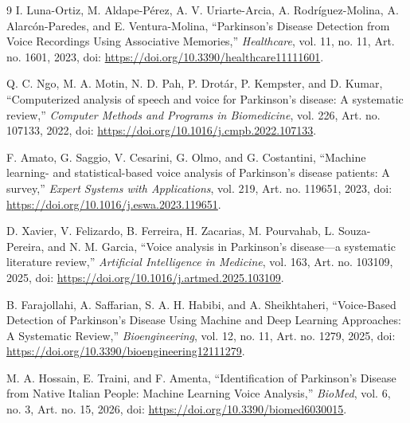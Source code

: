 \documentclass[11pt,a4paper]{article}
\begin{document}
\begin{thebibliography}{9}
I. Luna-Ortiz, M. Aldape-Pérez, A. V. Uriarte-Arcia, A. Rodríguez-Molina, A. Alarcón-Paredes, and E. Ventura-Molina, ``Parkinson's Disease Detection from Voice Recordings Using Associative Memories,'' \emph{Healthcare}, vol. 11, no. 11, Art. no. 1601, 2023, doi: \url{https://doi.org/10.3390/healthcare11111601}.

Q. C. Ngo, M. A. Motin, N. D. Pah, P. Drotár, P. Kempster, and D. Kumar, ``Computerized analysis of speech and voice for Parkinson's disease: A systematic review,'' \emph{Computer Methods and Programs in Biomedicine}, vol. 226, Art. no. 107133, 2022, doi: \url{https://doi.org/10.1016/j.cmpb.2022.107133}.

F. Amato, G. Saggio, V. Cesarini, G. Olmo, and G. Costantini, ``Machine learning- and statistical-based voice analysis of Parkinson's disease patients: A survey,'' \emph{Expert Systems with Applications}, vol. 219, Art. no. 119651, 2023, doi: \url{https://doi.org/10.1016/j.eswa.2023.119651}.

D. Xavier, V. Felizardo, B. Ferreira, H. Zacarias, M. Pourvahab, L. Souza-Pereira, and N. M. Garcia, ``Voice analysis in Parkinson's disease---a systematic literature review,'' \emph{Artificial Intelligence in Medicine}, vol. 163, Art. no. 103109, 2025, doi: \url{https://doi.org/10.1016/j.artmed.2025.103109}.

B. Farajollahi, A. Saffarian, S. A. H. Habibi, and A. Sheikhtaheri, ``Voice-Based Detection of Parkinson's Disease Using Machine and Deep Learning Approaches: A Systematic Review,'' \emph{Bioengineering}, vol. 12, no. 11, Art. no. 1279, 2025, doi: \url{https://doi.org/10.3390/bioengineering12111279}.

M. A. Hossain, E. Traini, and F. Amenta, ``Identification of Parkinson's Disease from Native Italian People: Machine Learning Voice Analysis,'' \emph{BioMed}, vol. 6, no. 3, Art. no. 15, 2026, doi: \url{https://doi.org/10.3390/biomed6030015}.
\end{thebibliography}
\end{document}
